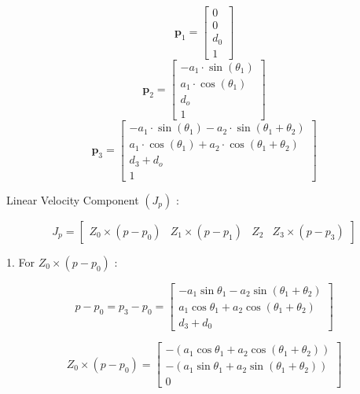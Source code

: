 \documentclass[12pt]{report}
\begin{document}
	\begin{equation}
	\textbf{p}_1=\left[\begin{array}{cccc}
		 0 \\
	 0 \\
	 d_0 \\
	 1
	\end{array}\right]
\end{equation}
\begin{equation}
	\textbf{p}_2= 
	\begin{bmatrix}
		 -a_1 \cdot \sin(\theta_1) \\
	 a_1 \cdot \cos(\theta_1) \\
	d_o \\
	1
	\end{bmatrix}
\end{equation}
\begin{equation}
	\textbf{p}_3=
	\begin{bmatrix}
		-a_1 \cdot \sin(\theta_1) - a_2 \cdot \sin(\theta_1 + \theta_2) \\
	 a_1 \cdot \cos(\theta_1) + a_2 \cdot \cos(\theta_1 + \theta_2) \\
	d_3 + d_o \\
1
	\end{bmatrix}
\end{equation}

Linear Velocity Component $\left(J_p\right)$ :

\begin{equation}
	J_p = \left[\begin{array}{llll}
		Z_0 \times\left(p-p_0\right) & Z_1 \times\left(p-p_1\right) & Z_2 & Z_3 \times\left(p-p_3\right)
	\end{array}\right]
\end{equation}

1. For $Z_0 \times\left(p-p_0\right)$ :

\begin{equation}
	p - p_0 = p_3 - p_0 =
	\begin{bmatrix}
		-a_1 \sin \theta_1 - a_2 \sin (\theta_1 + \theta_2) \\
		a_1 \cos \theta_1 + a_2 \cos (\theta_1 + \theta_2) \\
		d_3 + d_0
	\end{bmatrix}
\end{equation}

\begin{equation}
	Z_0 \times (p - p_0) =
	\begin{bmatrix}
		-\left(a_1 \cos \theta_1 + a_2 \cos (\theta_1 + \theta_2)\right) \\
		-\left(a_1 \sin \theta_1 + a_2 \sin (\theta_1 + \theta_2)\right) \\
		0
	\end{bmatrix}
\end{equation}
\end{document}
